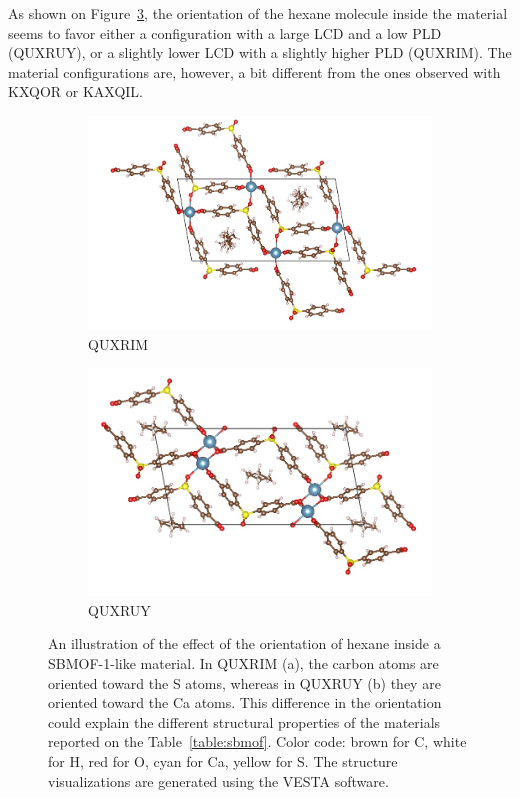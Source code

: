 \documentclass[main]{subfiles}
\begin{document}
As shown on Figure~\ref{fgr:ads_config}, the orientation of the hexane molecule inside the material seems to favor either a configuration with a large LCD and a low PLD (QUXRUY), or a slightly lower LCD with a slightly higher PLD (QUXRIM). The material configurations are, however, a bit different from the ones observed with KXQOR or KAXQIL. 

\begin{figure}[ht]
  \centering
  \begin{subfigure}[b]{0.45\textwidth}
    \centering
    \includegraphics[height=0.6\textwidth]{figures/6-perspectives/QUXRIM.jpg}
    \caption{QUXRIM}\label{fgr:QUXRIM}
  \end{subfigure}
  \hfill
  \begin{subfigure}[b]{0.45\textwidth}
    \centering
    \includegraphics[height=0.6\textwidth]{figures/6-perspectives/QUXRUY.jpg}
    \caption{QUXRUY}\label{fgr:QUXRUY}
  \end{subfigure}
  \caption{ An illustration of the effect of the orientation of hexane inside a SBMOF-1-like material. In QUXRIM (a), the carbon atoms are oriented toward the S atoms, whereas in QUXRUY (b) they are oriented toward the Ca atoms. This difference in the orientation could explain the different structural properties of the materials reported on the Table~\ref{table:sbmof}. Color code: brown for C, white for H, red for O, cyan for Ca, yellow for S. The structure visualizations are generated using the VESTA software.\autocite{VESTA}}\label{fgr:ads_config}
\end{figure}
\end{document}
